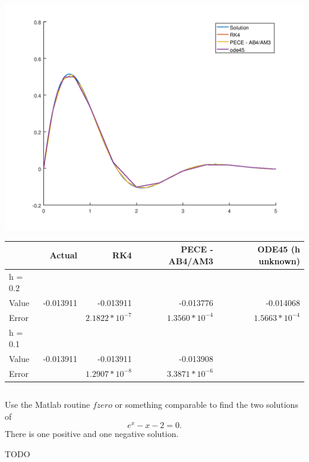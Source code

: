 \documentclass{jhwhw}
\begin{document}
\solution
    \begin{center}
	\includegraphics[scale=0.95]{p1_0_2}

	\begin{tabular}[pos]{|l|r|r|r|r|}
	    \hline
	    & Actual	& RK4			& PECE - AB4/AM3	& ODE45 (h unknown) \\ \hline
	    h = 0.2 &&&& \\ \hline
	    Value	& -0.013911	& -0.013911		& -0.013776  & -0.014068 \\ \hline
	    Error	& 		& $2.1822*10^{-7}$	& $1.3560*10^{-4}$ & $1.5663*10^{-4}$\\ \hline
	    h = 0.1 &&&& \\ \hline
	    Value	& -0.013911	& -0.013911		& -0.013908 & \\ \hline
	    Error	& 		& $1.2907*10^{-8}$	& $3.3871*10^{-6}$ & \\ \hline
	\end{tabular}
    \end{center}

    \inputminted[linenos,frame=lines,framesep=2mm]{octave}{p2.m}

\problem{}

    Use the Matlab routine $fzero$ or something comparable to find the two solutions of
    $$ e^x - x - 2 = 0.$$
    There is one positive and one negative solution.

\solution
    
    TODO
\end{document}
